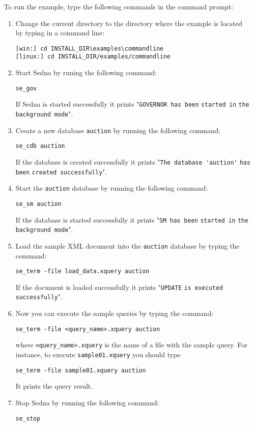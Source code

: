 \documentclass[a4paper,12pt]{article}
\begin{document}
To run the example, type the following commands in the command prompt:
\begin{enumerate}
\item Change the current directory to the directory where the example is located by typing in a command line:
\begin{verbatim}
[win:] cd INSTALL_DIR\examples\commandline
[linux:] cd INSTALL_DIR/examples/commandline
\end{verbatim}
\item Start Sedna by runing the following command: 
\begin{verbatim}
se_gov 
\end{verbatim}
If Sedna is started successfully it prints "\verb!GOVERNOR has been! \verb!started in! \verb!the background mode!".
\item Create a new database \verb!auction! by running the following command: 
\begin{verbatim}
se_cdb auction
\end{verbatim}
If the database is created successfully it prints "\verb!The database 'auction'! \verb!has been! \verb!created successfully!". 
\item Start the \verb!auction! database by running the following command:
\begin{verbatim}
se_sm auction
\end{verbatim}
If the database is started successfully it prints "\verb!SM has been! \verb!started in! \verb!the background mode!".
\item Load the sample XML document into the \verb!auction! database by typing the command:
\begin{verbatim}
se_term -file load_data.xquery auction
\end{verbatim}
If the document is loaded successfully it prints "\verb!UPDATE! \verb!is executed! \verb!successfully!".
\item Now you can execute the sample queries by typing the command:
\begin{verbatim}
se_term -file <query_name>.xquery auction
\end{verbatim}
where \verb!<query_name>.xquery! is the name of a file with the sample query.
For instance, to execute \verb!sample01.xquery! you should type 
\begin{verbatim}
se_term -file sample01.xquery auction
\end{verbatim}
It prints the query result.
\item Stop Sedna by running the following command:
\begin{verbatim}
se_stop
\end{verbatim}
\end{enumerate}
\end{document}
